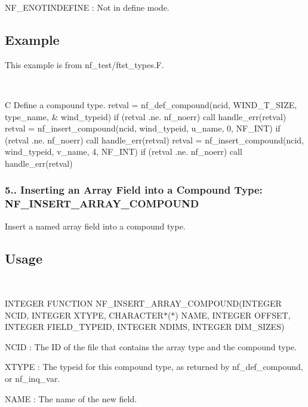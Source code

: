 {\ttfamily N\+F\+\_\+\+E\+N\+O\+T\+I\+N\+D\+E\+F\+I\+NE} \+: Not in define mode.

\subsection*{Example }

This example is from nf\+\_\+test/ftst\+\_\+types.\+F.

 

C Define a compound type. retval = nf\+\_\+def\+\_\+compound(ncid, W\+I\+N\+D\+\_\+\+T\+\_\+\+S\+I\+ZE, type\+\_\+name, \& wind\+\_\+typeid) if (retval .ne. nf\+\_\+noerr) call handle\+\_\+err(retval) retval = nf\+\_\+insert\+\_\+compound(ncid, wind\+\_\+typeid, u\+\_\+name, 0, N\+F\+\_\+\+I\+N\+T) if (retval .ne. nf\+\_\+noerr) call handle\+\_\+err(retval) retval = nf\+\_\+insert\+\_\+compound(ncid, wind\+\_\+typeid, v\+\_\+name, 4, N\+F\+\_\+\+I\+N\+T) if (retval .ne. nf\+\_\+noerr) call handle\+\_\+err(retval)\hypertarget{nc_f77_interface_guide_f77_NF-INSERT-ARRAY-COMPOUND}{}\subsubsection{5.. Inserting an Array Field into a Compound Type\+: N\+F\+\_\+\+I\+N\+S\+E\+R\+T\+\_\+\+A\+R\+R\+A\+Y\+\_\+\+C\+O\+M\+P\+O\+U\+ND}\label{nc_f77_interface_guide_f77_NF-INSERT-ARRAY-COMPOUND}
Insert a named array field into a compound type.

\subsection*{Usage }

 

I\+N\+T\+E\+G\+ER F\+U\+N\+C\+T\+I\+ON N\+F\+\_\+\+I\+N\+S\+E\+R\+T\+\_\+\+A\+R\+R\+A\+Y\+\_\+\+C\+O\+M\+P\+O\+U\+ND(I\+N\+T\+E\+G\+ER N\+C\+ID, I\+N\+T\+E\+G\+ER X\+T\+Y\+PE, C\+H\+A\+R\+A\+C\+T\+E\+R$\ast$($\ast$) N\+A\+ME, I\+N\+T\+E\+G\+ER O\+F\+F\+S\+ET, I\+N\+T\+E\+G\+ER F\+I\+E\+L\+D\+\_\+\+T\+Y\+P\+E\+ID, I\+N\+T\+E\+G\+ER N\+D\+I\+MS, I\+N\+T\+E\+G\+ER D\+I\+M\+\_\+\+S\+I\+Z\+ES)

{\ttfamily N\+C\+ID} \+: The ID of the file that contains the array type and the compound type.

{\ttfamily X\+T\+Y\+PE} \+: The typeid for this compound type, as returned by nf\+\_\+def\+\_\+compound, or nf\+\_\+inq\+\_\+var.

{\ttfamily N\+A\+ME} \+: The name of the new field.

